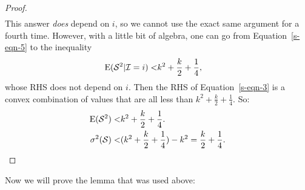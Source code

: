 \documentclass{article}
\newcommand{\ept}{\operatornamewithlimits{E}}
\begin{document}
\begin{proof}
\begin{align}
\end{align}
This answer {\em does} depend on $i$, so we cannot use the exact same argument for a fourth time.
However, with a little bit of algebra, one can go from Equation~\eqref{s-eqn-5} to the inequality
\begin{align*}
\ept(\mathcal{S}^2|\mathcal{I}=i) < & k^2 + \frac{k}{2} + \frac{1}{4},
\end{align*}
whose RHS does not depend on $i$. Then the RHS of Equation~\eqref{s-eqn-3}
is a convex combination of values that are all less than 
$k^2 + \frac{k}{2} + \frac{1}{4}$. So:
\begin{align*}
\ept(\mathcal{S}^2) < & k^2 + \frac{k}{2} + \frac{1}{4}. \\
\sigma^2(\mathcal{S}) < & (k^2 + \frac{k}{2} + \frac{1}{4}) - k^2 = \frac{k}{2} + \frac{1}{4}.
\end{align*}
\end{proof}

\noindent Now we will prove the lemma that was used above:
\end{document}
